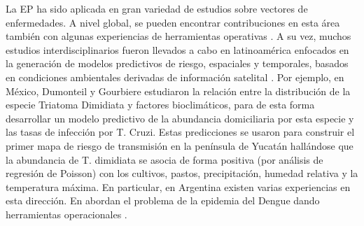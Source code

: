 \par La EP ha sido aplicada en gran variedad de estudios sobre vectores de
  enfermedades. A nivel global, se pueden encontrar contribuciones en esta área
  \cite{herbreteau, kalluri_surveillance, data_driven_prediction} también con
  algunas experiencias de herramientas operativas \cite{bowman_alarm}.
  A su vez, muchos estudios interdisciplinarios fueron llevados a cabo en
  latinoamérica enfocados en la generación de modelos predictivos de riesgo,
  espaciales y temporales, basados en condiciones ambientales derivadas de
  información satelital \cite{enao_gis_y_sr, fuller_costa_rica, madrin_correlating, arboleda_colombia}.
  Por ejemplo, en México, Dumonteil y Gourbiere \cite{mexico}
  estudiaron la relación entre la distribución de la especie Triatoma Dimidiata
  y factores bioclimáticos, para de esta forma desarrollar un modelo predictivo de
  la abundancia domiciliaria por esta especie y las tasas de infección
  por T. Cruzi. Estas predicciones se usaron para construir el primer mapa de
  riesgo de transmisión en la península de Yucatán hallándose que la abundancia de T.
  dimidiata se asocia de forma positiva (por análisis de regresión de Poisson)
  con los cultivos, pastos, precipitación, humedad relativa y la temperatura
  máxima. En particular, en Argentina existen varias experiencias en esta
  dirección. En \cite{rotela_space_time, estallo_prevention, espinosa_temporal} abordan el problema de la epidemia del Dengue dando
  herramientas operacionales \cite{porcasi_operative}.

